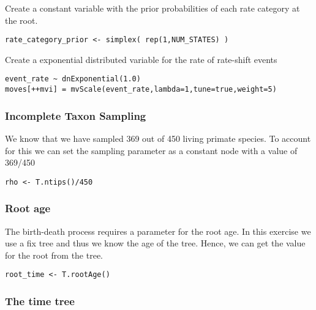 Create a constant variable with the prior probabilities of each rate category at the root.
{\tt \begin{snugshade*}
\begin{lstlisting}
rate_category_prior <- simplex( rep(1,NUM_STATES) )
\end{lstlisting}
\end{snugshade*}}

Create a exponential distributed variable for the rate of rate-shift events
{\tt \begin{snugshade*}
\begin{lstlisting}
event_rate ~ dnExponential(1.0)
moves[++mvi] = mvScale(event_rate,lambda=1,tune=true,weight=5)
\end{lstlisting}
\end{snugshade*}}



\subsubsection{Incomplete Taxon Sampling}

We know that we have sampled 369 out of 450 living primate species. 
To account for this we can set the sampling parameter as a constant node with a value of 369/450
{\tt \begin{snugshade*}
\begin{lstlisting}
rho <- T.ntips()/450
\end{lstlisting}
\end{snugshade*}}


\subsubsection{Root age}

The birth-death process requires a parameter for the root age.
In this exercise we use a fix tree and thus we know the age of the tree.
Hence, we can get the value for the root from the \citet{Springer2012} tree.
{\tt \begin{snugshade*}
\begin{lstlisting}
root_time <- T.rootAge()
\end{lstlisting}
\end{snugshade*}}

\subsubsection{The time tree}

